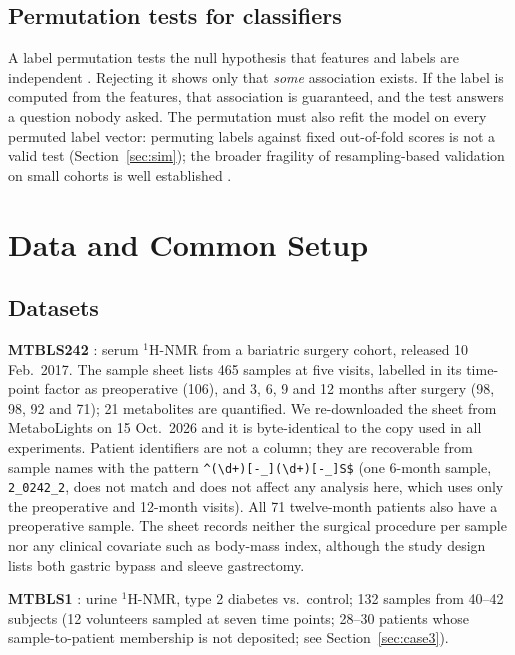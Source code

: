 \documentclass[conference]{IEEEtran}
\begin{document}
\subsection{Permutation tests for classifiers}
A label permutation tests the null hypothesis that features and labels are
independent \cite{ojala2010}. Rejecting it shows only that \emph{some}
association exists. If the label is computed from the features, that
association is guaranteed, and the test answers a question nobody asked.
The permutation must also refit the model on every permuted label vector:
permuting labels against fixed out-of-fold scores is not a valid test
(Section~\ref{sec:sim}); the broader fragility of resampling-based
validation on small cohorts is well established
\cite{westerhuis2008, broadhurst2006, varma2006, varoquaux2018}.

\section{Data and Common Setup}
\label{sec:data}

\subsection{Datasets}
\textbf{MTBLS242} \cite{mtbls242, gralka2015}: serum $^1$H-NMR from a
bariatric surgery cohort, released 10 Feb.\ 2017. The sample sheet lists 465
samples at five visits, labelled in its time-point factor as preoperative
(106), and 3, 6, 9 and 12 months after surgery (98, 98, 92 and 71);
21 metabolites are quantified. We re-downloaded the sheet from MetaboLights
on 15 Oct.\ 2026 and it is byte-identical to the copy used in all
experiments. Patient identifiers are not a column; they are recoverable from
sample names with the pattern \verb|^(\d+)[-_](\d+)[-_]S$| (one 6-month
sample, \verb|2_0242_2|, does not match and does not affect any analysis
here, which uses only the preoperative and 12-month visits). All 71
twelve-month patients also have a preoperative sample. The sheet records
neither the surgical procedure per sample nor any clinical covariate such as
body-mass index, although the study design lists both gastric bypass and
sleeve gastrectomy.

\textbf{MTBLS1} \cite{salek2007}: urine $^1$H-NMR, type 2 diabetes vs.\
control; 132 samples from 40--42 subjects (12 volunteers sampled at seven
time points; 28--30 patients whose sample-to-patient membership is not
deposited; see Section~\ref{sec:case3}).
\end{document}
